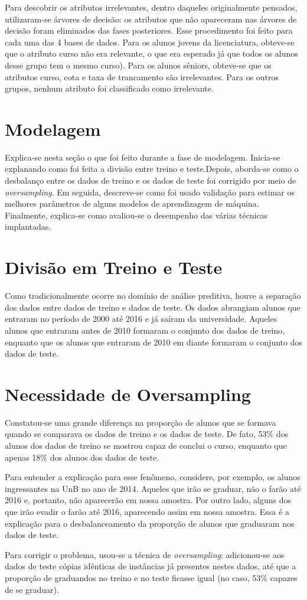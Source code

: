 \par Para descobrir os atributos irrelevantes, dentro daqueles originalmente
pensados, utilizaram-se árvores de decisão: os atributos que não apareceram nas
árvores de decisão foram eliminados das fases posteriores. Esse procedimento foi
feito para cada uma das 4 bases de dados. Para os alunos jovens da licenciatura,
obteve-se que o atributo curso não era relevante, o que era esperado já que todos os alunos
desse grupo tem o mesmo curso). Para os alunos sêniors, obteve-se que os atributos
curso, cota e taxa de trancamento são irrelevantes. Para os outros grupos, nenhum
atributo foi classificado como irrelevante. 

\section{Modelagem}
Explica-se nesta seção o que foi feito durante a fase de modelagem. Inicia-se
explanando como foi feita a divisão entre treino e teste.Depois, aborda-se como o
desbalanço entre os dados de treino e os dados de teste foi corrigido por meio de
\textit{oversampling}.
Em seguida, descreve-se como foi usado validação para estimar os melhores parâmetros
de alguns modelos de aprendizagem de máquina. Finalmente, explica-se como avaliou-se
o desempenho das várias técnicas implantadas.  

\section{Divisão em Treino e Teste}
Como tradicionalmente ocorre no domínio de análise preditiva, houve a separação dos
dados entre dados de treino e dados de teste. Os dados abrangiam alunos que entraram
no período de 2000 até 2016 e já saíram da universidade. Aqueles alunos que entraram
antes de 2010 formaram o conjunto dos dados de treino, enquanto que os alunos que
entraram de 2010 em diante formaram o conjunto dos dados de teste. 

\section{Necessidade de Oversampling}
Constatou-se uma grande diferença na proporção de alunos que se formava quando se
comparava os dados de treino e os dados de teste. De fato, 53\% dos
alunos dos dados de treino se mostrou capaz de conclui o curso, enquanto que apenas
18\% dos alunos dos dados de teste.
\par Para entender a explicação para esse fenômeno, considere, por exemplo, os alunos
ingressantes na UnB no ano de 2014. Aqueles que irão se graduar, não o farão até 2016
e, portanto, não aparecerão em nossa amostra. Por outro lado, alguns dos que irão
evadir o farão até 2016, aparecendo assim em nossa amostra. Essa é a explicação para
o desbalanceamento da proporção de alunos que graduaram nos dados de teste. 
\par Para corrigir o problema, usou-se a técnica de \textit{oversampling}:
adicionou-se aos dados de teste cópias idênticas de instâncias já presentes nestes
dados, até que a proporção de graduandos no treino e no teste ficasse igual (no caso,
53\% capazes de se graduar). 

